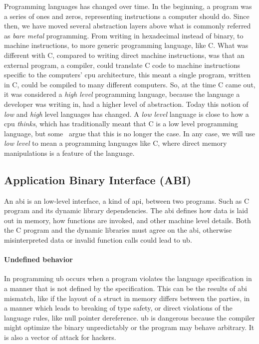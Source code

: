 Programming languages has changed over time. In the beginning, a program was a
series of ones and zeros, representing instructions a computer should do. Since
then, we have moved several abstraction layers above what is commonly referred
as \textit{bare metal} programming. From writing in hexadecimal instead of
binary, to machine instructions, to more generic programming language, like C.
What was different with C, compared to writing direct machine instructions, was
that an external program, a compiler, could translate C code to machine
instructions specific to the computers' \gls*{cpu} architecture, this meant a
single program, written in C, could be compiled to many different computers. So,
at the time C came out, it was considered a \textit{high level} programming
language, because the language a developer was writing in, had a higher level of
abstraction. Today this notion of \textit{low} and \textit{high} level languages
has changed. A \textit{low level} language is close to how a \gls*{cpu}
\textit{thinks}, which has traditionally meant that C is a low level programming
language, but some~\cite{cNotLowLevel} argue that this is no longer the
case. In any case, we will use \textit{low level} to mean a programming
languages like C, where direct memory manipulations is a feature of the
language.

\subsection{Application Binary Interface (ABI)}

An \gls*{abi} is an low-level interface, a kind of \gls*{api},
between two programs. Such as C program and its dynamic library dependencies.
The \gls*{abi} defines how data is laid out in memory, how functions are
invoked, and other machine level details. Both the C program and the dynamic
libraries must agree on the \gls*{abi}, otherwise misinterpreted data or invalid
function calls could lead to \gls*{ub}.

\paragraph{Undefined behavior} In programming \gls*{ub} occurs when a program
violates the language specification in a manner that is not defined by the
specification. This can be the results of \gls*{abi} mismatch, like if the
layout of a struct in memory differs between the parties, in a manner which
leads to breaking of type safety, or direct violations of the language rules,
like null pointer dereference. \gls*{ub} is dangerous because the compiler might
optimize the binary unpredictably or the program may behave arbitrary. It is
also a vector of attack for hackers.



